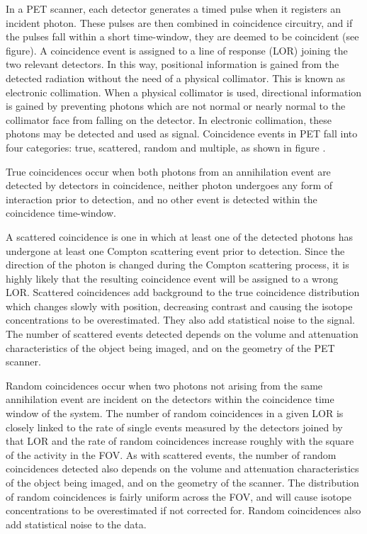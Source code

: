 In a \ac{PET} scanner, each detector generates a timed pulse when it registers an incident photon. These pulses are then combined in coincidence circuitry, and if the pulses fall within a short time-window, they are deemed to be coincident (see figure).
A coincidence event is assigned to a line of response (\ac{LOR}) joining the two relevant detectors. In this way, positional information is gained from the detected radiation without the need of a physical collimator. This is known as electronic collimation.
When a physical collimator is used, directional information is gained by preventing photons which are not normal or nearly normal to the collimator face from falling on the detector. In electronic collimation, these photons may be detected and used as signal.
Coincidence events in \ac{PET} fall into four categories: true, scattered, random and multiple, as shown in figure . 

True coincidences occur when both photons from an annihilation event are detected by detectors in coincidence, neither photon undergoes any form of interaction prior to detection, and no other event is detected within the coincidence time-window.

A scattered coincidence is one in which at least one of the detected photons has undergone at least one Compton scattering event prior to detection. Since the direction of the photon is changed during the Compton scattering process, it is highly likely that the resulting coincidence event will be assigned to a wrong \ac{LOR}. Scattered coincidences add background to the true coincidence distribution which changes slowly with position, decreasing contrast and causing the isotope concentrations to be overestimated. They also add statistical noise to the signal. The number of scattered events detected depends on the volume and attenuation characteristics of the object being imaged, and on the geometry of the \ac{PET} scanner.

Random coincidences occur when two photons not arising from the same annihilation event are incident on the detectors within the coincidence time window of the system. The number of random coincidences in a given \ac{LOR} is closely linked to the rate of single events measured by the detectors joined by that \ac{LOR} and the rate of random coincidences increase roughly with the square of the activity in the \ac{FOV}. As with scattered events, the number of random coincidences detected also depends on the volume and attenuation characteristics of the object being imaged, and on the geometry of the scanner. The distribution of random coincidences is fairly uniform across the \ac{FOV}, and will cause isotope concentrations to be overestimated if not corrected for. Random coincidences also add statistical noise to the data.

